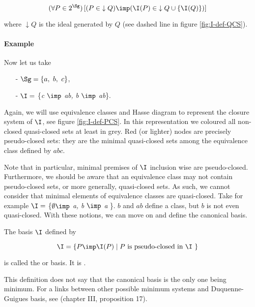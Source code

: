 \[ (\forall P \in 2^{\Sg})\left[( P \in \; \downarrow Q) \imp (\I(P) \in \; 
\downarrow Q \cup \{\I(Q)\})\right] \]

\noindent where $\downarrow Q$ is the ideal generated by $Q$ (see dashed line
in figure \ref{fig:I-def-QCS}). 

\paragraph{Example} Now let us take 
\begin{itemize}
	\item[-] $\Sg = \{a, \ b, \ c \}$,
	\item[-] $\I = $ \{\textit{c $\imp$ ab, b $\imp$ ab}\}.
\end{itemize}
Again, we will use equivalence classes and Hasse diagram to represent the 
closure system of $\I$, see figure \ref{fig:I-def-PCS}. In this representation
we coloured all non-closed quasi-closed sets at least in grey. Red (or lighter) nodes are precisely pseudo-closed sets: they are the minimal quasi-closed sets among the equivalence class defined by $abc$. 

\newpage

\begin{figure}[ht]
	
\end{figure}

Note that in particular, minimal premises of $\I$ inclusion wise are 
pseudo-closed. Furthermore, we should be aware that an equivalence class may
not contain pseudo-closed sets, or more generally, quasi-closed sets. As such,
we cannot consider that minimal elements of equivalence classes are 
quasi-closed. Take for example $\I =$ \{\textit{$\emptyset \imp $ a, b $\imp$ a 
}\}. $b$ and $ab$ define a class, but $b$ is not even quasi-closed. With these
notions, we can move on and define the canonical basis.

\begin{definition} The basis $\I$ defined by
	
	\[ \I = \{ P \imp \I(P) \; | \; P \text{ is pseudo-closed in $\I$ } \} \]
	
	\noindent is called the  or  
	basis. 
	It is .
	
\end{definition}

\noindent This definition does not say that the canonical basis is the only one
being minimum. For a links between other possible minimum systems and Duquenne-Guigues basis, see \cite{ganter_conceptual_2016} (chapter III, proposition 17).

